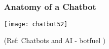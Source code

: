 \begin{frame}[fragile]\frametitle{Anatomy of a Chatbot}

\begin{center}
\texttt{[image: chatbot52]}

{\tiny (Ref: Chatbots and AI - botfuel )}

\end{center}

\end{frame}





